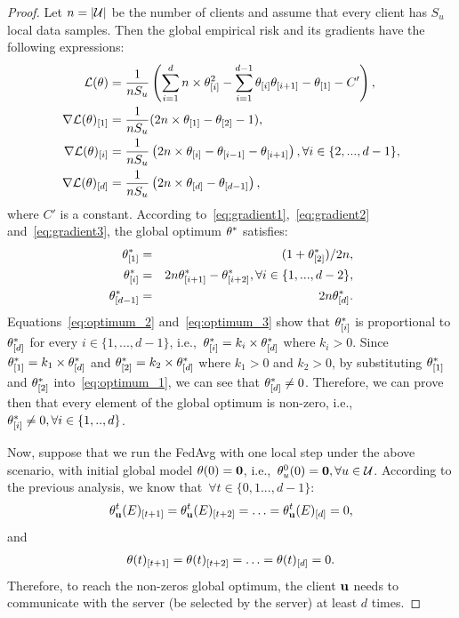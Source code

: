 \begin{proof}
Let $n = |\mathcal{U}|$ be the number of clients and assume that every client has $S_u$ local data samples. Then the global empirical risk and its gradients have the following expressions: 
\begin{align}
{\ensuremath{\mathcal{L}}}(\theta) &= \frac{1}{nS_u} \left(\sum_{i=1}^{d} n\times \theta_{[i]}^2 - \sum_{i=1}^{d-1} \theta_{[i]}\theta_{[i+1]} -\theta_{[1]} - C' \right), \label{eq:global_function_design} \\
\nabla {\ensuremath{\mathcal{L}}}(\theta)_{[1]} &=  
\frac{1}{nS_u}(2n\times \theta_{[1]} - \theta_{[2]} - 1),\label{eq:gradient1}\\
\nabla {\ensuremath{\mathcal{L}}}(\theta)_{[i]} &=\frac{1}{nS_u} \left( 2n\times \theta_{[i]} - \theta_{[i-1]} - \theta_{[i+1]} \right), \forall i\in\{2,...,d-1\},\label{eq:gradient2} \\
\nabla {\ensuremath{\mathcal{L}}}(\theta)_{[d]} &= \frac{1}{nS_u} \left( 2n\times \theta_{[d]} - \theta_{[d-1]} \right) \label{eq:gradient3},
\end{align}
where $C'$ is a constant. According to~\eqref{eq:gradient1},~\eqref{eq:gradient2} and~\eqref{eq:gradient3}, the global optimum $\theta^*$ satisfies:
\begin{eqnarray}
\theta^*_{[1]} &=& (1+\theta^*_{[2]})/2n, \label{eq:optimum_1}\\ 
\theta^*_{[i]} &=& 2n\theta^*_{[i+1]} - \theta^*_{[i+2]}, \forall i\in\{1,...,d-2\},\label{eq:optimum_2}\\
\theta^*_{[d-1]}  &=& 2n\theta^*_{[d]}.\label{eq:optimum_3}
\end{eqnarray}
Equations~\ref{eq:optimum_2} and~\ref{eq:optimum_3} show that $\theta^*_{[i]}$ is proportional to $\theta^*_{[d]}$ for every $i\in\{1,...,d-1\}$, i.e.,~$\theta^*_{[i]} = k_i\times \theta^*_{[d]}$ where $k_i>0$. 
Since $\theta^*_{[1]} = k_1\times \theta^*_{[d]}$ and $\theta^*_{[2]} = k_2\times \theta^*_{[d]}$ where $k_1>0$ and $k_2>0$, by substituting $\theta^*_{[1]}$ and  $\theta^*_{[2]}$ into~\eqref{eq:optimum_1}, we can see that $\theta^*_{[d]} \not = 0$.
Therefore, we can prove then that every element of the global optimum is non-zero, i.e.,~$\theta^*_{[i]} \not = 0, \forall i\in \{1,..,d\}$.

Now, suppose that we run the FedAvg with one local step under the above scenario, with initial global model $\theta(0) = \mathbf{0}$, i.e.,~$\theta^0_u(0) = \mathbf{0}, \forall u\in \mathcal{U}$. 
According to the previous analysis, we know that~$\forall t\in \{0,1...,d-1\}$:
\begin{eqnarray}
\theta^t_{\mathbf{u}}(E)_{[t+1]} = \theta^t_{\mathbf{u}}(E)_{[t+2]} = \ldots = \theta^t_{\mathbf{u}}(E)_{[d]} = 0,
\end{eqnarray}
and
\begin{eqnarray}
\theta(t)_{[t+1]} = \theta(t)_{[t+2]} = \ldots = \theta(t)_{[d]} = 0.
\end{eqnarray}
Therefore, to reach the non-zeros global optimum, the client $\mathbf{u}$ needs to communicate with the server (be selected by the server) at least $d$ times. 


\end{proof}
